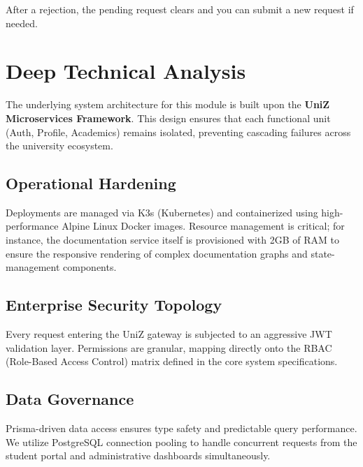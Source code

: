 After a rejection, the pending request clears and you can submit a new request if needed.


\section{Deep Technical Analysis}
The underlying system architecture for this module is built upon the \textbf{UniZ Microservices Framework}. 
This design ensures that each functional unit (Auth, Profile, Academics) remains isolated, preventing cascading failures across the university ecosystem.

\subsection{Operational Hardening}
Deployments are managed via K3s (Kubernetes) and containerized using high-performance Alpine Linux Docker images. 
Resource management is critical; for instance, the documentation service itself is provisioned with 2GB of RAM to ensure the responsive rendering of complex documentation graphs and state-management components.

\subsection{Enterprise Security Topology}
Every request entering the UniZ gateway is subjected to an aggressive JWT validation layer. 
Permissions are granular, mapping directly onto the RBAC (Role-Based Access Control) matrix defined in the core system specifications.

\subsection{Data Governance}
Prisma-driven data access ensures type safety and predictable query performance. 
We utilize PostgreSQL connection pooling to handle concurrent requests from the student portal and administrative dashboards simultaneously.
